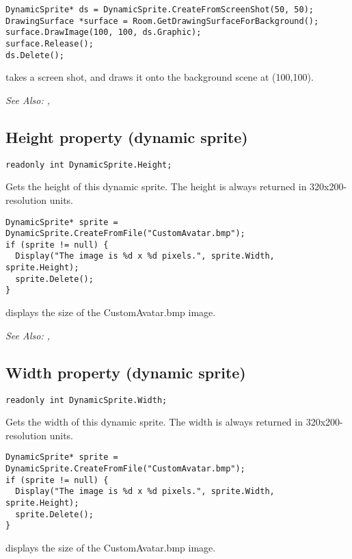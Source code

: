 \begin{verbatim}
DynamicSprite* ds = DynamicSprite.CreateFromScreenShot(50, 50);
DrawingSurface *surface = Room.GetDrawingSurfaceForBackground();
surface.DrawImage(100, 100, ds.Graphic);
surface.Release();
ds.Delete();
\end{verbatim}
takes a screen shot, and draws it onto the background scene at (100,100).

\it{See Also:} ,


\subsection{Height property (dynamic sprite)}\label{DynamicSprite.Height}%

\begin{verbatim}
readonly int DynamicSprite.Height;
\end{verbatim}
Gets the height of this dynamic sprite. The height is always returned in 320x200-resolution units.

\begin{verbatim}
DynamicSprite* sprite = DynamicSprite.CreateFromFile("CustomAvatar.bmp");
if (sprite != null) {
  Display("The image is %d x %d pixels.", sprite.Width, sprite.Height);
  sprite.Delete();
}
\end{verbatim}
displays the size of the CustomAvatar.bmp image.

\it{See Also:} ,


\subsection{Width property (dynamic sprite)}\label{DynamicSprite.Width}%

\begin{verbatim}
readonly int DynamicSprite.Width;
\end{verbatim}
Gets the width of this dynamic sprite. The width is always returned in 320x200-resolution units.

\begin{verbatim}
DynamicSprite* sprite = DynamicSprite.CreateFromFile("CustomAvatar.bmp");
if (sprite != null) {
  Display("The image is %d x %d pixels.", sprite.Width, sprite.Height);
  sprite.Delete();
}
\end{verbatim}
displays the size of the CustomAvatar.bmp image.

